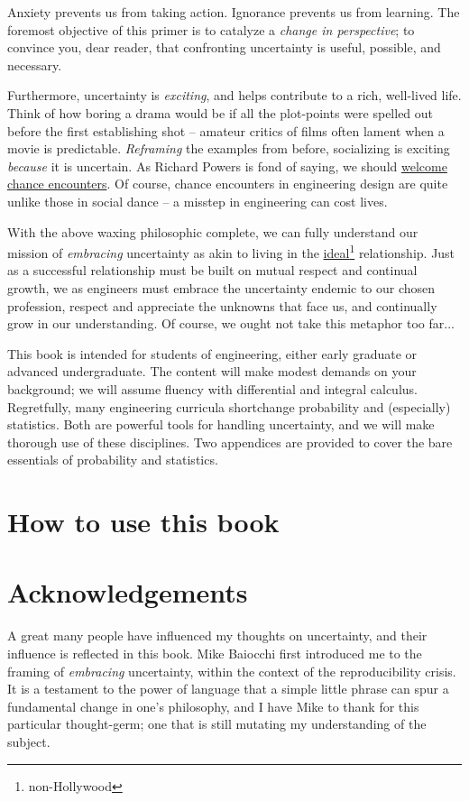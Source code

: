 \documentclass[../primer.tex]{subfiles}
\begin{document}
Anxiety prevents us from taking action. Ignorance prevents us from learning. The
foremost objective of this primer is to catalyze a \emph{change in perspective};
to convince you, dear reader, that confronting uncertainty is useful, possible,
and necessary.

Furthermore, uncertainty is \emph{exciting}, and helps contribute to a rich,
well-lived life. Think of how boring a drama would be if all the plot-points
were spelled out before the first establishing shot -- amateur critics of films
often lament when a movie is predictable. \emph{Reframing} the examples from
before, socializing is exciting \emph{because} it is uncertain. As Richard
Powers is fond of saying, we should
\href{https://socialdance.stanford.edu/Syllabi/vertlateral.htm}{welcome chance
  encounters}. Of course, chance encounters in engineering design are quite
unlike those in social dance -- a misstep in engineering can cost lives.

With the above waxing philosophic complete, we can fully understand our mission
of \emph{embracing} uncertainty as akin to living in the
\href{https://qz.com/884448/every-successful-relationship-is-successful-for-the-same-exact-reasons/?utm_source=FBP011317_1}{ideal}\footnote{non-Hollywood}
relationship. Just as a successful relationship must be built on mutual respect
and continual growth, we as engineers must embrace the uncertainty endemic to
our chosen profession, respect and appreciate the unknowns that face us, and
continually grow in our understanding. Of course, we ought not take this
metaphor too far...

This book is intended for students of engineering, either early graduate or
advanced undergraduate. The content will make modest demands on your background;
we will assume fluency with differential and integral calculus. Regretfully,
many engineering curricula shortchange probability and (especially) statistics.
Both are powerful tools for handling uncertainty, and we will make thorough use
of these disciplines. Two appendices are provided to cover the bare essentials
of probability and statistics.

\section{How to use this book}

\section{Acknowledgements}
A great many people have influenced my thoughts on uncertainty, and their
influence is reflected in this book. Mike Baiocchi first introduced me to the
framing of \emph{embracing} uncertainty, within the context of the
reproducibility crisis. It is a testament to the power of language that a simple
little phrase can spur a fundamental change in one's philosophy, and I have Mike
to thank for this particular thought-germ; one that is still mutating my
understanding of the subject.
\end{document}
